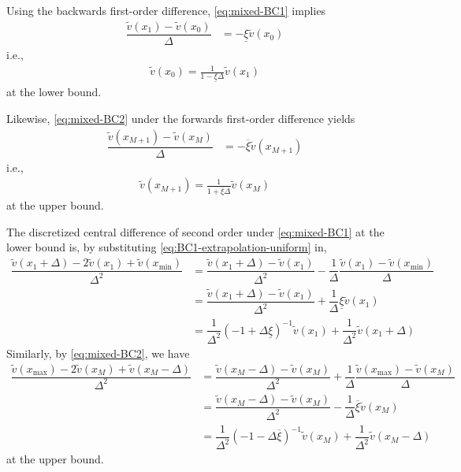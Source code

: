 \documentclass[11pt]{article}
\theoremstyle{definition}
\begin{document}
Using the backwards first-order difference, \eqref{eq:mixed-BC1} implies
\begin{align}
\dfrac{\tilde{v}({x_{1}}) - \tilde{v}(x_{0})}{\Delta} &= - \underline{\xi} \tilde{v}({x_{0}})
\end{align}
i.e.,
\begin{align}\label{eq:BC1-extrapolation-uniform}
\tilde{v}(x_0) = \frac{1}{1-\underline{\xi} \Delta } \tilde{v}(x_1)
\end{align}
at the lower bound.

Likewise, \eqref{eq:mixed-BC2} under the forwards first-order difference yields
\begin{align}
\dfrac{\tilde{v}(x_{M+1}) - \tilde{v}({x_{M}})}{\Delta} &= - \overline{\xi} \tilde{v}({x_{M+1} })
\end{align}
i.e.,
\begin{align}\label{eq:BC2-extrapolation-uniform}
\tilde{v}(x_{M+1}) = \frac{1}{1+\overline{\xi} \Delta } \tilde{v}(x_M)
\end{align}
at the upper bound.

The discretized central difference of second order under \eqref{eq:mixed-BC1} at the lower bound is, by substituting \eqref{eq:BC1-extrapolation-uniform} in,
\begin{align}
\dfrac{\tilde{v}({x_{1}} + \Delta) - 2 \tilde{v}({x_{1}}) + \tilde{v}(x_{\min})}{\Delta^2} &=   \dfrac{\tilde{v}({x_{1}} + \Delta) - \tilde{v}({x_{1}})}{\Delta^2} - \dfrac{1}{\Delta}\dfrac{\tilde{v}({x_{1}}) - \tilde{v}(x_{\min}) }{\Delta}  \\
&= \dfrac{\tilde{v}({x_{1}} + \Delta) - \tilde{v}({x_{1}})}{\Delta^2} + \dfrac{1}{\Delta} \underline{\xi} \tilde{v}({x_{1}})  \\
&= \dfrac{1}{\Delta^2}  (- 1 + \Delta \underline{\xi})^{-1} \tilde{v}({x_{1}})  + \dfrac{1}{\Delta^2}  \tilde{v}({x_{1}} + \Delta)
\end{align}
Similarly, by \eqref{eq:mixed-BC2}, we have
\begin{align}
\dfrac{\tilde{v}(x_{\max}) - 2 \tilde{v}({x_{M}} ) + \tilde{v}({x_{M}} -\Delta)}{\Delta^2} &=   \dfrac{\tilde{v}({x_{M}} - \Delta) - \tilde{v}({x_{M}})}{\Delta^2} + \dfrac{1}{\Delta}\dfrac{ \tilde{v}(x_{\max}) - \tilde{v}({x_{M}}) }{\Delta}  \\
&= \dfrac{\tilde{v}({x_{M}} - \Delta) - \tilde{v}({x_{M}})}{\Delta^2}  - \dfrac{1}{\Delta} \overline{\xi} \tilde{v}({x_{M}})  \\
&= \dfrac{1}{\Delta^2}  (- 1 - \Delta \overline{\xi})^{-1} \tilde{v}({x_{M}})  + \dfrac{1}{\Delta^2}  \tilde{v}({x_{M}} - \Delta)
\end{align}
at the upper bound.
\end{document}
